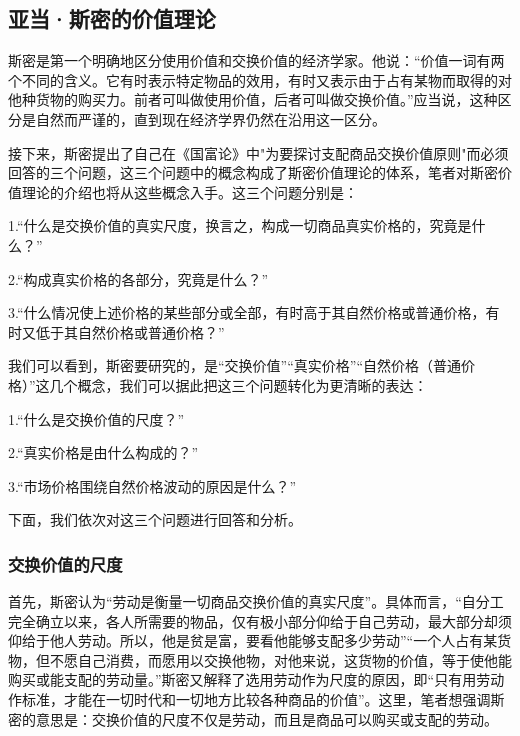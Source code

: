 \subsection{亚当·斯密的价值理论}

斯密是第一个明确地区分使用价值和交换价值的经济学家\cite[122]{CaiJiMingCongGuDianZhengZhiJingJiXueDaoZhongGuoTeSeSheHuiZhuYiZhengZhiJingJiXueJiYuZhongGuoShiJiaoDeZhengZhiJingJiXueYanBianShangCe2023}。他说：“价值一词有两个不同的含义。它有时表示特定物品的效用，有时又表示由于占有某物而取得的对他种货物的购买力。前者可叫做使用价值，后者可叫做交换价值。”\cite[24]{YaDang*SiMiGuoFuLun2015}应当说，这种区分是自然而严谨的，直到现在经济学界仍然在沿用这一区分。

接下来，斯密提出了自己在《国富论》中"为要探讨支配商品交换价值原则"\cite[24]{YaDang*SiMiGuoFuLun2015}而必须回答的三个问题，这三个问题中的概念构成了斯密价值理论的体系，笔者对斯密价值理论的介绍也将从这些概念入手。这三个问题分别是：

1.“什么是交换价值的真实尺度，换言之，构成一切商品真实价格的，究竟是什么？”\cite[24]{YaDang*SiMiGuoFuLun2015}

2.“构成真实价格的各部分，究竟是什么？”\cite[24]{YaDang*SiMiGuoFuLun2015}

3.“什么情况使上述价格的某些部分或全部，有时高于其自然价格或普通价格，有时又低于其自然价格或普通价格？”\cite[24]{YaDang*SiMiGuoFuLun2015}

我们可以看到，斯密要研究的，是“交换价值”“真实价格”“自然价格（普通价格）”这几个概念，我们可以据此把这三个问题转化为更清晰的表达：

1.“什么是交换价值的尺度？”

2.“真实价格是由什么构成的？”

3.“市场价格围绕自然价格波动的原因是什么？”

下面，我们依次对这三个问题进行回答和分析。

\subsubsection{交换价值的尺度}

首先，斯密认为“劳动是衡量一切商品交换价值的真实尺度”\Cite[25]{YaDang*SiMiGuoFuLun2015}。具体而言，“自分工完全确立以来，各人所需要的物品，仅有极小部分仰给于自己劳动，最大部分却须仰给于他人劳动。所以，他是贫是富，要看他能够支配多少劳动”\cite[25]{YaDang*SiMiGuoFuLun2015}“一个人占有某货物，但不愿自己消费，而愿用以交换他物，对他来说，这货物的价值，等于使他能购买或能支配的劳动量。”\cite[25]{YaDang*SiMiGuoFuLun2015}斯密又解释了选用劳动作为尺度的原因，即“只有用劳动作标准，才能在一切时代和一切地方比较各种商品的价值”\cite[31]{YaDang*SiMiGuoFuLun2015}。这里，笔者想强调斯密的意思是：交换价值的尺度不仅是劳动，而且是商品可以购买或支配的劳动。

